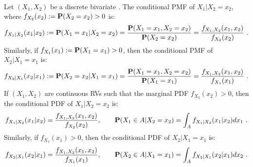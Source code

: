 \begin{definition}
Let $(X_1,X_2)$ be a discrete bivariate \rv.  The conditional PMF of $X_1|X_2=x_2$, where $f_{X_2}(x_2) := \mathbf{P}(X_2=x_2) > 0$ is:
\[
f_{X_1|X_2}(x_1 | x_2) := \mathbf{P}(X_1=x_1 | X_2=x_2) = \frac{\mathbf{P}(X_1=x_1,X_2=x_2)}{\mathbf{P}(X_2=x_2)} = \frac{f_{X_1,X_2}(x_1,x_2)}{f_{X_2}(x_2)} \ .
\]
Similarly, if $f_{X_1}(x_1) := \mathbf{P}(X_1=x_1) >0$, then the conditional PMF of $X_2|X_1=x_1$ is:
\[
f_{X_2|X_1}(x_2|x_1) := \mathbf{P}(X_2=x_2 | X_1=x_1) = \frac{\mathbf{P}(X_1=x_1,X_2=x_2)}{\mathbf{P}(X_1=x_1)} = \frac{f_{X_1,X_2}(x_1,x_2)}{f_{X_1}(x_1)} \ .
\]
If $(X_1,X_2)$ are continuous RVs such that the marginal PDF $f_{X_2}(x_2)>0$, then the conditional PDF of $X_1|X_2=x_2$ is:
\[
f_{X_1|X_2}(x_1|x_2) = \frac{f_{X_1,X_2}(x_1,x_2)}{f_{X_2}(x_2)}, \qquad \mathbf{P}(X_1 \in A| X_2=x_2) = \int_A f_{X_1|X_2}(x_1|x_2) dx_1 \ .
\]
Similarly, if $f_{X_1}(x_1)>0$, then the conditional PDF of $X_2|X_1=x_1$ is:
\[
f_{X_2|X_1}(x_2|x_1) = \frac{f_{X_1,X_2}(x_1,x_2)}{f_{X_1}(x_1)}, \qquad \mathbf{P}(X_2 \in A| X_1=x_1) = \int_A f_{X_2|X_1}(x_2|x_1) dx_2 \ .
\]
\end{definition}

